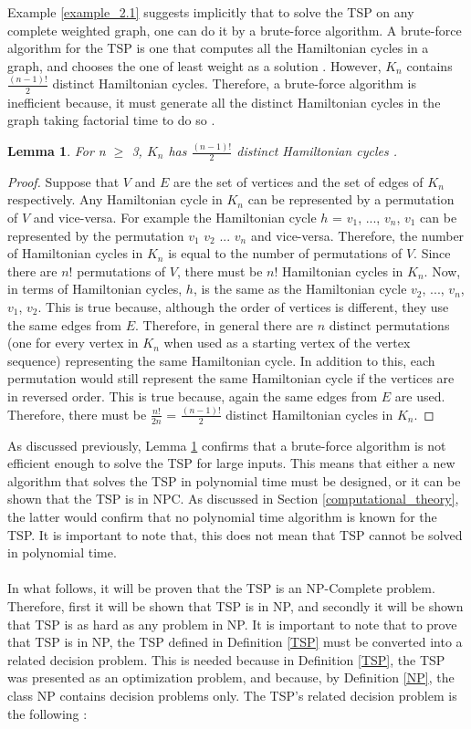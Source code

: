 \documentclass[12pt]{article}
\newtheorem{lemma}[definition]{Lemma}
\numberwithin{equation}{subsection}
\numberwithin{table}{subsection}
\numberwithin{algorithm}{subsection}
\begin{document}
Example \ref{example_2.1} suggests implicitly that to solve the TSP on any complete weighted graph, one can do it by a brute-force algorithm. A brute-force algorithm for the TSP is one that computes all the Hamiltonian cycles in a graph, and chooses the one of least weight as a solution \cite{Sanchit}. However, $\mathit{K_n}$ contains $\mathit{\frac{(n-1)!}{2}}$ distinct Hamiltonian cycles. Therefore, a brute-force algorithm is inefficient because, it must generate all the distinct Hamiltonian cycles in the graph taking factorial time to do so \cite{Sanchit}. 
\begin{lemma}
\label{distinct_hamiltonian_cycles}
For n $\geq$ 3, $K_n$ has $\frac{(n-1)!}{2}$ distinct Hamiltonian cycles {}. 
\end{lemma}
\begin{proof}
Suppose that $V$ and $E$ are the set of vertices and the set of edges of $K_n$ respectively. Any Hamiltonian cycle in $K_n$ can be represented by a permutation of $V$ and vice-versa. For example the Hamiltonian cycle $h$ = $v_1$, ..., $v_n$, $v_1$ can be represented by the permutation $v_1$ $v_2$ ... $v_n$ and vice-versa. Therefore, the number of Hamiltonian cycles in $K_n$ is equal to the number of permutations of $V$. Since there are $n!$ permutations of $V$, there must be $n!$ Hamiltonian cycles in $K_n$. Now, in terms of Hamiltonian cycles, $h$, is the same as the Hamiltonian cycle $v_2$, ..., $v_n$, $v_1$, $v_2$. This is true because, although the order of vertices is different, they use the same edges from $E$. Therefore, in general there are $n$ distinct permutations (one for every vertex in $K_n$ when used as a starting vertex of the vertex sequence) representing the same Hamiltonian cycle. In addition to this, each permutation would still represent the same Hamiltonian cycle if the vertices are in reversed order. This is true because, again the same edges from $E$ are used. Therefore, there must be $\frac{n!}{2n}$ = $\frac{(n-1)!}{2}$ distinct Hamiltonian cycles in $K_n$.
\end{proof}
As discussed previously, Lemma \ref{distinct_hamiltonian_cycles} confirms that a brute-force algorithm is not efficient enough to solve the TSP for large inputs. This means that either a new algorithm that solves the TSP in polynomial time must be designed, or it can be shown that the TSP is in NPC. As discussed in Section \ref{computational_theory}, the latter would confirm that no polynomial time algorithm is known for the TSP. It is important to note that, this does not mean that TSP cannot be solved in polynomial time.\\\\ In what follows, it will be proven that the TSP is an NP-Complete problem. Therefore, first it will be shown that TSP is in NP, and secondly it will be shown that TSP is as hard as any problem in NP. It is important to note that to prove that TSP is in NP, the TSP defined in Definition \ref{TSP} must be converted into a related decision problem. This is needed because in Definition \ref{TSP}, the TSP was presented as an optimization problem, and because, by Definition \ref{NP}, the class NP contains decision problems only. The TSP's related decision problem is the following :
\end{document}
